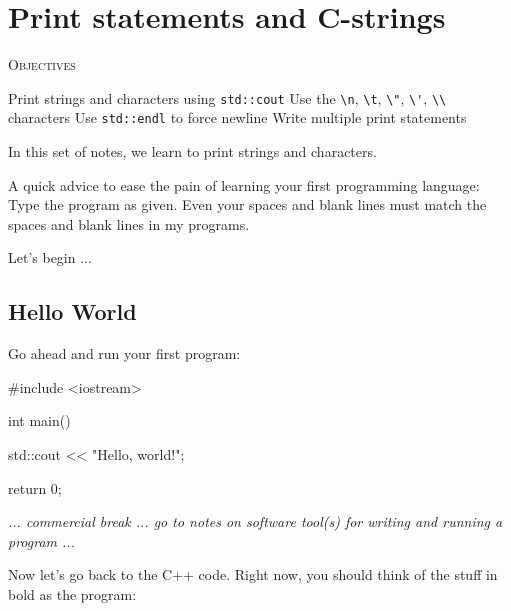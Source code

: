 

\chapter{Print statements and C-strings}


\textsc{Objectives}
\begin{myenum}
\li Print strings and characters using \verb!std::cout!
\li Use the \verb!\n!, \verb!\t!, \verb!\"!, \verb!\'!, 
    \verb!\\! characters
\li Use \verb!std::endl! to force newline
\li Write multiple print statements
\end{myenum}

In this set of notes, we learn to print strings and characters.

A quick advice to ease the pain of learning your first programming language: 
Type the program 
 as given. 
Even your spaces and blank lines must match the spaces 
and blank lines in my programs.

Let's begin ...


\newpage\section{Hello World}

Go ahead and run your first program:
\begin{console}
#include <iostream>

int main()
{
    std::cout << "Hello, world!\n";

    return 0;
}
\end{console}

\textit{ ... commercial break ... go to notes on software tool(s)
  for writing and running a program ...}

Now let's go back to the C++ code.
Right now, you should think of the stuff in bold as the program:

